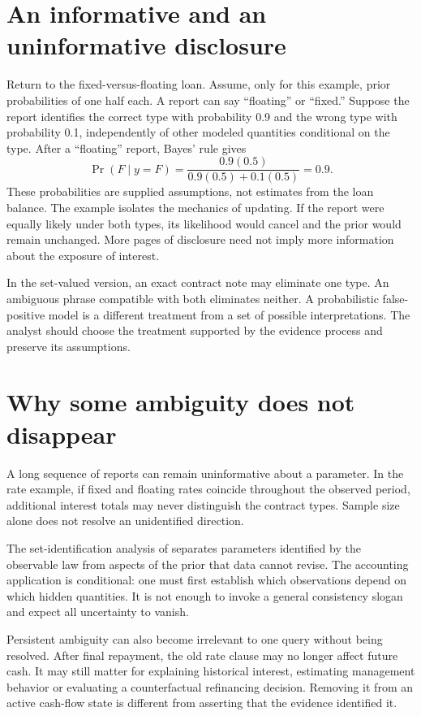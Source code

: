 

\section{An informative and an uninformative disclosure}
Return to the fixed-versus-floating loan. Assume, only for this example, prior probabilities of one half each. A report can say ``floating'' or ``fixed.'' Suppose the report identifies the correct type with probability 0.9 and the wrong type with probability 0.1, independently of other modeled quantities conditional on the type. After a ``floating'' report, Bayes' rule gives
\begin{equation}
 \Pr(F\mid y=F)=\frac{0.9(0.5)}{0.9(0.5)+0.1(0.5)}=0.9.
\end{equation}
These probabilities are supplied assumptions, not estimates from the loan balance. The example isolates the mechanics of updating. If the report were equally likely under both types, its likelihood would cancel and the prior would remain unchanged. More pages of disclosure need not imply more information about the exposure of interest.

In the set-valued version, an exact contract note may eliminate one type. An ambiguous phrase compatible with both eliminates neither. A probabilistic false-positive model is a different treatment from a set of possible interpretations. The analyst should choose the treatment supported by the evidence process and preserve its assumptions.

\section{Why some ambiguity does not disappear}
A long sequence of reports can remain uninformative about a parameter. In the rate example, if fixed and floating rates coincide throughout the observed period, additional interest totals may never distinguish the contract types. Sample size alone does not resolve an unidentified direction.

The set-identification analysis of \citet[Sections 2.1--2.3]{giacomini2021} separates parameters identified by the observable law from aspects of the prior that data cannot revise. The accounting application is conditional: one must first establish which observations depend on which hidden quantities. It is not enough to invoke a general consistency slogan and expect all uncertainty to vanish.

Persistent ambiguity can also become irrelevant to one query without being resolved. After final repayment, the old rate clause may no longer affect future cash. It may still matter for explaining historical interest, estimating management behavior or evaluating a counterfactual refinancing decision. Removing it from an active cash-flow state is different from asserting that the evidence identified it.

